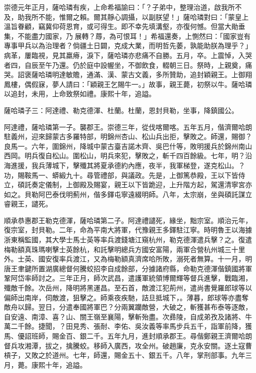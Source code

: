 \begin{pinyinscope}
崇德元年正月，薩哈璘有疾，上命希福諭曰：「？子弟中，整理治道，啟我所不及，助我所不能，惟爾之賴。爾其靜心調攝，以副朕望！」薩哈璘對曰：「蒙皇上溫旨眷顧，竊冀仰荷恩育，或可得生。即不幸先填溝壑，亦復何憾。但當大勛垂集，不能盡力國家，乃展轉？蓐，為可恨耳！」希福還奏，上惻然曰：「國家豈有專事甲兵以為治理者？倘疆土日闢，克成大業，而明哲先萎，孰能助朕為理乎？」病革，屢臨視，見其羸瘠，淚下，薩哈璘亦悲痛不自勝。五月，卒。上震悼，入哭者四，自辰至午乃還。仍於庭中設幄坐，不御飲食，輟朝三日。祭時，上親奠，痛哭。詔褒薩哈璘明達敏贍，通滿、漢、蒙古文義，多所贊助，追封穎親王。上御翔鳳樓，偶假寐，夢人請曰：「穎親王乞賜牛一。」故事，親王薨，初祭以牛。薩哈璘以追封，未用，上命致祭如禮。康熙十年，追謚。

薩哈璘子三：阿達禮、勒克德渾、杜蘭。杜蘭，恩封貝勒，坐事，降鎮國公。

阿達禮，薩哈璘第一子。襲郡王。崇德三年，從伐喀爾喀。五年五月，偕濟爾哈朗駐義州，迎來歸蒙古多羅特部，明錦州杏山、松山兵出拒，擊敗之。師還，賜御？良馬一。六年，圍錦州，降城中蒙古臺吉諾木齊、吳巴什等，敗明援兵於錦州南山西岡。明兵復自松山。圍松山，明兵來犯，擊敗之，斬千四百餘級。七年，明？沿海進援，我兵薄城下，擊殲其將夏承德約內應，夜半，我軍梯登，遂克松山。？功，賜鞍馬一、蟒緞九十。尋管禮部，與議政。先是，上御篤恭殿，王以下皆侍立，碩託奏定儀制，上御殿及賜宴，親王以下皆跪迎，上升階方起，駕還清寧宮亦如之。貝勒阿巴泰伐明薊州，偕多鐸屯寧遠綴明師。八年，太宗崩，坐與碩託謀立睿親王，譴死。

順承恭惠郡王勒克德渾，薩哈璘第二子。阿達禮譴死，緣坐，黜宗室。順治元年，復宗室，封貝勒。二年，命為平南大將軍，代豫親王多鐸駐江寧。時明魯王以海據浙東稱監國，其大學士馬士英等率兵渡錢塘江窺杭州，勒克德渾遣兵擊？之。復遣梅勒額真珠瑪喇擊士英餘杭，和託擊明總兵方國安富陽，兩軍合營杭州城三十里外。士英、國安復率兵渡江，又為梅勒額真濟席哈所敗，溺死者無算。十一月，明唐王聿鍵所置湖廣總督何騰蛟招李自成餘部，分據諸府縣，命勒克德渾偕鎮國將軍鞏阿岱率師討之。三年正月，師次武昌，遣護軍統領博爾輝等督兵進擊，戰臨湘，殲敵千餘。次岳州，降明將黑運昌。至石首，敵渡江犯荊州，遣尚書覺羅郎球等以偏師出南岸，伺敵渡，狙擊之。師乘夜疾馳，詰旦抵城下，。薄暮，郎球等亦盡奪敵舟以歸。翌日，分遣奉國將軍巴？分兩翼躪敵營，大破之，斬獲甚布泰等逐敵，自安遠、南漳、喜？山、關王嶺至襄陽，擊斬殆盡。次彞陵，自成弟孜及諸將、牛萬二千餘。捷聞，？田見秀、張耐、李佑、吳汝義等率馬步兵五千，詣軍前降，獲馬、優詔班師，賜金百、銀二千。五年九月，進封順承郡王。尋偕鄭親王濟爾哈朗督兵攻湘潭，拔之，擒騰蛟。移師入廣西，攻全州。破趙廉，克永安關。逐土寇曹槓子，又敗之於道州。七年，師還，賜金五十、銀五千。八年，掌刑部事。九年三月，薨。康熙十年，追謚。


\end{pinyinscope}
